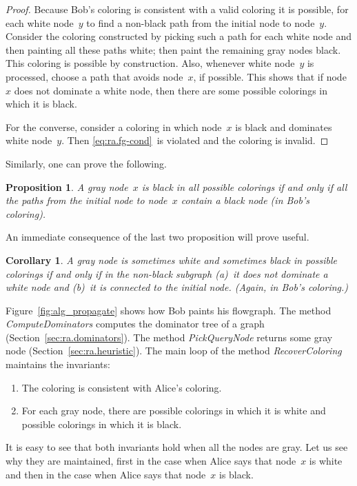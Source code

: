 \documentclass[a4paper]{article}
\theoremstyle{slanted}
\newtheorem{proposition}{Proposition}
\newtheorem{corollary}{Corollary}
\theoremstyle{definition}
\theoremstyle{remark}
\begin{document}
\begin{proof}
Because Bob's coloring is consistent with a valid coloring it is
possible, for each white node~$y$ to find a non-black path from
the initial node to node~$y$. Consider the coloring constructed
by picking such a path for each white node and then painting all
these paths white; then paint the remaining gray nodes black.
This coloring is possible by construction. Also, whenever white
node~$y$ is processed, choose a path that avoids node~$x$, if
possible. This shows that if node~$x$ does not dominate a white
node, then there are some possible colorings in which it is
black. 

For the converse, consider a coloring in which node~$x$ is black
and dominates white node~$y$. Then \eqref{eq:ra.fg-cond}~is
violated and the coloring is invalid.
\end{proof}

Similarly, one can prove the following.

\begin{proposition}
A gray node~$x$ is black in all possible colorings if and only if
all the paths from the initial node to node~$x$ contain a black
node (in Bob's coloring). \label{prop:ra.fix-black}
\end{proposition}

An immediate consequence of the last two proposition will prove
useful.

\begin{corollary}
A gray node is sometimes white and sometimes black in possible
colorings if and only if in the non-black subgraph (a)~it does
not dominate a white node and (b)~it is connected to the initial
node. (Again, in Bob's coloring.)
\label{co:ra.propagate}
\end{corollary}

Figure~\ref{fig:alg_propagate} shows how Bob paints his
flowgraph. The method \textit{ComputeDominators} computes the
dominator tree of a graph (Section~\ref{sec:ra.dominators}).
The method \textit{PickQueryNode} returns some gray node
(Section~\ref{sec:ra.heuristic}). The main loop of the method
\textit{RecoverColoring} maintains the invariants:
\begin{enumerate}
\item The coloring is consistent with Alice's coloring.
\item 
  For each gray node, there are possible colorings in which
  it is white and possible colorings in which it is black.
\end{enumerate}
It is easy to see that both invariants hold when all the nodes
are gray. Let us see why they are maintained, first in the case
when Alice says that node~$x$ is white and then in the case when
Alice says that node~$x$ is black.
\end{document}
